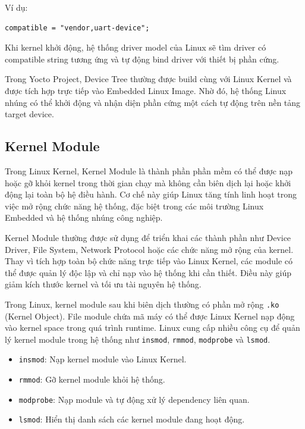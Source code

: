 Ví dụ:

\begin{verbatim}
compatible = "vendor,uart-device";
\end{verbatim}

Khi kernel khởi động, hệ thống driver model của Linux sẽ tìm driver có compatible string tương ứng và tự động bind driver với thiết bị phần cứng.

Trong Yocto Project, Device Tree thường được build cùng với Linux Kernel và được tích hợp trực tiếp vào Embedded Linux Image. Nhờ đó, hệ thống Linux nhúng có thể khởi động và nhận diện phần cứng một cách tự động trên nền tảng target device.

\subsection{Kernel Module}

Trong Linux Kernel, Kernel Module là thành phần phần mềm có thể được nạp hoặc gỡ khỏi kernel trong thời gian chạy mà không cần biên dịch lại hoặc khởi động lại toàn bộ hệ điều hành. Cơ chế này giúp Linux tăng tính linh hoạt trong việc mở rộng chức năng hệ thống, đặc biệt trong các môi trường Linux Embedded và hệ thống nhúng công nghiệp.\cite{kernel_modules_doc}

Kernel Module thường được sử dụng để triển khai các thành phần như Device Driver, File System, Network Protocol hoặc các chức năng mở rộng của kernel. Thay vì tích hợp toàn bộ chức năng trực tiếp vào Linux Kernel, các module có thể được quản lý độc lập và chỉ nạp vào hệ thống khi cần thiết. Điều này giúp giảm kích thước kernel và tối ưu tài nguyên hệ thống.

Trong Linux, kernel module sau khi biên dịch thường có phần mở rộng \texttt{.ko} (Kernel Object). File module chứa mã máy có thể được Linux Kernel nạp động vào kernel space trong quá trình runtime. Linux cung cấp nhiều công cụ để quản lý kernel module trong hệ thống như \texttt{insmod}, \texttt{rmmod}, \texttt{modprobe} và \texttt{lsmod}.

\begin{itemize}
    \item \texttt{insmod}: Nạp kernel module vào Linux Kernel.
    
    \item \texttt{rmmod}: Gỡ kernel module khỏi hệ thống.
    
    \item \texttt{modprobe}: Nạp module và tự động xử lý dependency liên quan.
    
    \item \texttt{lsmod}: Hiển thị danh sách các kernel module đang hoạt động.
\end{itemize}

